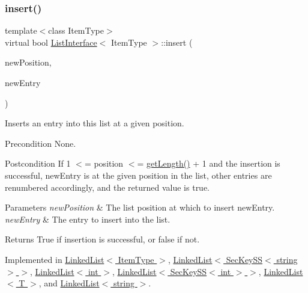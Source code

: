 \mbox{\label{classListInterface_a5b2f86954a86172699a3495982c38e77}} 
\subsubsection{\texorpdfstring{insert()}{insert()}}
{\footnotesize\ttfamily template$<$class Item\+Type$>$ \\
virtual bool \hyperlink{classListInterface}{List\+Interface}$<$ Item\+Type $>$\+::insert (\begin{DoxyParamCaption}\item[{int}]{new\+Position,  }\item[{const Item\+Type \&}]{new\+Entry }\end{DoxyParamCaption})\hspace{0.3cm}{\ttfamily [pure virtual]}}

Inserts an entry into this list at a given position. \begin{DoxyPrecond}{Precondition}
None. 
\end{DoxyPrecond}
\begin{DoxyPostcond}{Postcondition}
If 1 $<$= position $<$= \hyperlink{classListInterface_afc85695d4137f1e29ff02e179c9f3221}{get\+Length()} + 1 and the insertion is successful, new\+Entry is at the given position in the list, other entries are renumbered accordingly, and the returned value is true. 
\end{DoxyPostcond}

\begin{DoxyParams}{Parameters}
{\em new\+Position} & The list position at which to insert new\+Entry. \\
\hline
{\em new\+Entry} & The entry to insert into the list. \\
\hline
\end{DoxyParams}
\begin{DoxyReturn}{Returns}
True if insertion is successful, or false if not. 
\end{DoxyReturn}


Implemented in \hyperlink{classLinkedList_ae8a19375505e87e2e4fc0e9b5afe4d4d}{Linked\+List$<$ Item\+Type $>$}, \hyperlink{classLinkedList_ae8a19375505e87e2e4fc0e9b5afe4d4d}{Linked\+List$<$ Sec\+Key\+S\+S$<$ string $>$ $>$}, \hyperlink{classLinkedList_ae8a19375505e87e2e4fc0e9b5afe4d4d}{Linked\+List$<$ int $>$}, \hyperlink{classLinkedList_ae8a19375505e87e2e4fc0e9b5afe4d4d}{Linked\+List$<$ Sec\+Key\+S\+S$<$ int $>$ $>$}, \hyperlink{classLinkedList_ae8a19375505e87e2e4fc0e9b5afe4d4d}{Linked\+List$<$ T $>$}, and \hyperlink{classLinkedList_ae8a19375505e87e2e4fc0e9b5afe4d4d}{Linked\+List$<$ string $>$}.

